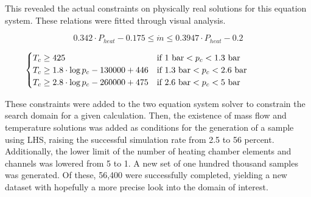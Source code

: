 \documentclass{homework}
\begin{document}
\begin{multicols}{2}
  This revealed the actual constraints on physically real solutions for this equation system. These relations were fitted through visual analysis.

    $$ 0.342 \cdot P_{heat} - 0.175  \leq \dot{m} \leq 0.3947 \cdot P_{heat} -0.2 $$ 
  
  $$
  \hspace{-50pt}
  \begin{cases}
    T_c \geq425 & \text{if } 1 \ \text{bar} < p_c < 1.3 \ \text{bar}\\
    T_c \geq 1.8 \cdot \log{p_c - 130000} + 446 & \text{if }1.3 \ \text{bar} < p_c < 2.6 \ \text{bar} \\
   T_c \geq 2.8 \cdot \log{p_c - 260000} + 475 & \text{if } 2.6 \ \text{bar} < p_c < 5 \ \text{bar}
  \end{cases}    
  $$
    
  These constraints were added to the two equation system solver to constrain the search domain for a given calculation. Then, the existence of mass flow and temperature solutions was added as conditions for the generation of a sample using LHS, raising the successful simulation rate from 2.5 to 56 percent. Additionally, the lower limit of the number of heating chamber elements and channels was lowered from 5 to 1. A new set of one hundred thousand samples was generated. Of these, 56,400 were successfully completed, yielding a new dataset with hopefully a more precise look into the domain of interest.


\end{multicols}
\end{document}
